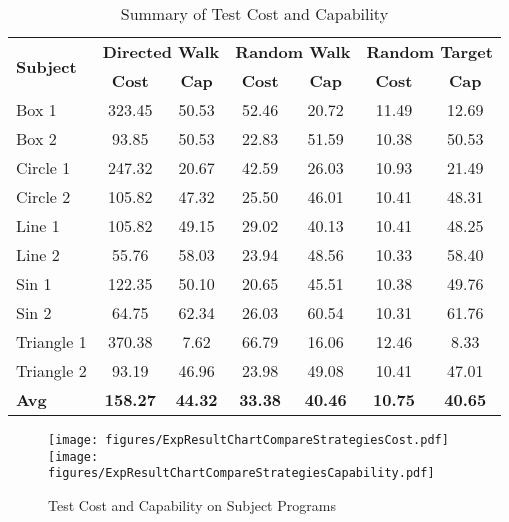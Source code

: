 \documentclass[preprint,1p,authoryear,times]{elsarticle}
\begin{document}
\begin{table}[htbp]
\caption{Summary of Test Cost and Capability}
\begin{scriptsize}
\begin{center}
\begin{tabular}{|p{1.4cm}|c|c|c|c|c|c|}
\hline
\multirow{2}{*}{\textbf{Subject}} &\multicolumn{2}{c|}{\textbf{Directed Walk}} &\multicolumn{2}{c|}{\textbf{Random Walk}} &\multicolumn{2}{c|}{\textbf{Random Target }}\\ \cline{2-7}
& \textbf{Cost} &\textbf{Cap} &\textbf{Cost} &\textbf{Cap} &\textbf{Cost} &\textbf{Cap}\\ \hline
Box 1 		&323.45 	&50.53 	&52.46 	&20.72 	&11.49 	&12.69\\ \hline
Box 2 		&93.85 	&50.53 	&22.83 	&51.59 	&10.38 	&50.53\\ \hline
Circle 1 	&247.32 	&20.67 	&42.59 	&26.03 	&10.93 	&21.49\\ \hline
Circle 2 	&105.82 	&47.32 	&25.50 	&46.01 	&10.41 	&48.31\\ \hline
Line 1 		&105.82 	&49.15 	&29.02 	&40.13 	&10.41 	&48.25\\ \hline
Line 2 		&55.76 	&58.03 	&23.94 	&48.56 	&10.33 	&58.40\\ \hline
Sin 1 		&122.35 	&50.10 	&20.65 	&45.51 	&10.38 	&49.76\\ \hline
Sin 2 		&64.75 	&62.34 	&26.03 	&60.54 	&10.31 	&61.76\\ \hline
Triangle 1 	&370.38 	&7.62 	&66.79 	&16.06 	&12.46 	&8.33\\ \hline
Triangle 2 	&93.19 	&46.96 	&23.98 	&49.08 	&10.41 	&47.01\\ \hline
\textbf{Avg}  &\textbf{158.27} &\textbf{44.32} &\textbf{33.38} &\textbf{40.46} &\textbf{10.75} &\textbf{40.65}\\ \hline
\end{tabular}
\end{center}
\end{scriptsize}
\label{tab:ComparisonOfStrategies}
\end{table}

\begin{figure}[htbp]
	\centering
	\texttt{[image: figures/ExpResultChartCompareStrategiesCost.pdf]}
	\texttt{[image: figures/ExpResultChartCompareStrategiesCapability.pdf]}
	\caption{Test Cost and Capability on Subject Programs}
	\label{fig:ResultChartCompareStrategyEffectiveness}
\end{figure}
\end{document}
